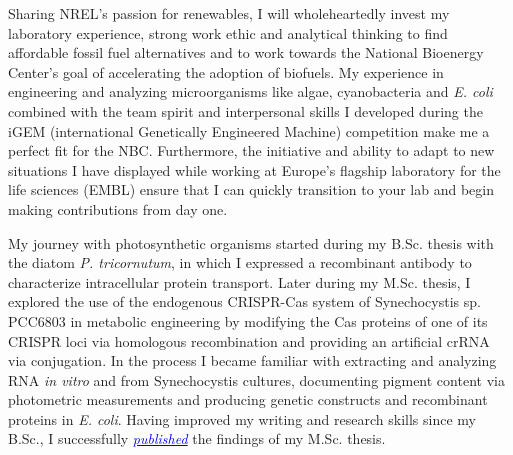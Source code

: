 \documentclass[11pt,a4paper,sans]{moderncv}
\date{\today}
\begin{document}
     
\makelettertitle
\begin{spacing}{1.2}


Sharing NREL's passion for renewables, I will wholeheartedly invest my laboratory experience, strong work ethic and analytical thinking to find affordable fossil fuel alternatives and to work towards the National Bioenergy Center's goal of accelerating the adoption of biofuels.
My experience in engineering and analyzing microorganisms like algae, cyanobacteria and \textit{E. coli} combined with the team spirit and interpersonal skills I developed during the iGEM (international Genetically Engineered Machine) competition make me a perfect fit for the NBC. 
Furthermore, the initiative and ability to adapt to new situations I have displayed while working at Europe's flagship laboratory for the life sciences (EMBL) ensure that I can quickly transition to your lab and begin making contributions from day one.\par\vspace*{3mm}


My journey with photosynthetic organisms started during my B.Sc. thesis with the diatom \textit{P. tricornutum}, in which I expressed a recombinant antibody to characterize intracellular protein transport. 
Later during my M.Sc. thesis, I explored the use of the endogenous CRISPR-Cas system of Synechocystis sp. PCC6803 in metabolic engineering by modifying the Cas proteins of one of its CRISPR loci via homologous recombination and providing an artificial crRNA via conjugation.
In the process I became familiar with extracting and analyzing RNA \textit{in vitro} and from Synechocystis cultures, documenting pigment content via photometric measurements and producing genetic constructs and recombinant proteins in \textit{E. coli}.
 Having improved my writing and research skills since my B.Sc., I successfully {\href{https://www.tandfonline.com/eprint/vmAQ3vjYGdZIZpIKQTIT/full}{\textcolor{blue}{{\textit{published}}}}} the findings of my M.Sc. thesis. 
\par\vspace*{3mm}
 

\end{spacing}
\end{document}
